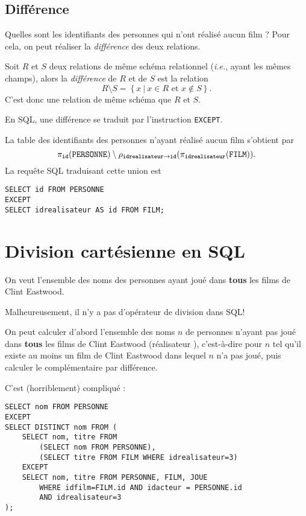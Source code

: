 \subsection{Différence}
Quelles sont les identifiants des personnes qui n'ont réalisé aucun film ? Pour cela, on peut réaliser  la \emph{différence} des deux relations.

\begin{defi}[Différence]
  Soit $R$ et $S$ deux relations de même schéma relationnel (\emph{i.e.}, ayant les mêmes champs), alors la \emph{différence} de $R$ et de $S$ est la relation 
  \begin{equation*}
    R\setminus S = \left\{x ~|~ x\in R\textrm{ et }x\notin S\right\}.
  \end{equation*}
  C'est donc une relation de même schéma que $R$ et $S$.
\end{defi}

En SQL, une différence se traduit par l'instruction \texttt{EXCEPT}.
\begin{exemple}
La table des identifiants des personnes n'ayant réalisé aucun film s'obtient par 
\begin{equation*}
  \pi_{\mathtt{id}}(\mathtt{PERSONNE})\setminus \rho_{\mathtt{idrealisateur}\rightarrow\mathtt{id}}(\pi_{\mathtt{idrealisateur}}(\mathtt{FILM})).
\end{equation*}
La requête SQL traduisant cette union est 
\begin{verbatim}
SELECT id FROM PERSONNE
EXCEPT
SELECT idrealisateur AS id FROM FILM;
\end{verbatim}
\end{exemple}

\section{Division cartésienne en SQL}

On veut l'ensemble des  noms des personnes ayant
joué dans \textbf{tous} les films de Clint Eastwood.

Malheureusement, il n'y a pas d'opérateur de division dans SQL!

On peut calculer d'abord l'ensemble des noms $n$ de personnes n'ayant pas joué dans \textbf{tous} les
films de Clint Eastwood (réalisateur ), c'est-à-dire pour $n$ tel
qu'il existe
au moins un film de Clint Eastwood dans lequel $n$ n'a pas joué, puis
calculer le complémentaire par différence.

C'est (horriblement) compliqué :
\begin{Verbatim}
SELECT nom FROM PERSONNE
EXCEPT
SELECT DISTINCT nom FROM (
    SELECT nom, titre FROM
        (SELECT nom FROM PERSONNE),
        (SELECT titre FROM FILM WHERE idrealisateur=3)
    EXCEPT
    SELECT nom, titre FROM PERSONNE, FILM, JOUE
        WHERE idfilm=FILM.id AND idacteur = PERSONNE.id
        AND idrealisateur=3
);
\end{Verbatim}

